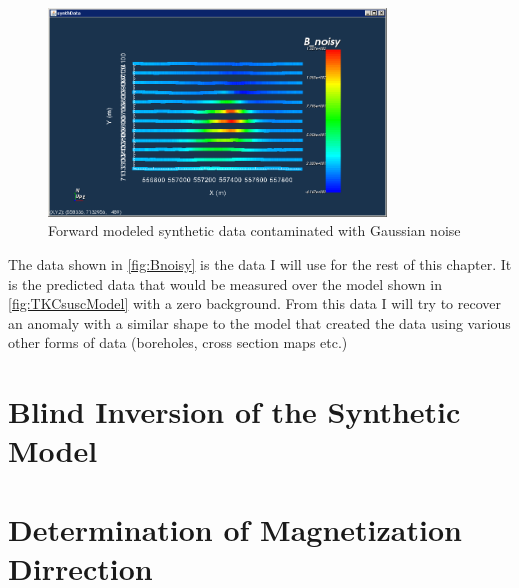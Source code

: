 \begin{figure} [h]
   \centering
   \includegraphics[width=0.8\textwidth]{images/TKC/Bnoisy.PNG}
   \caption{Forward modeled synthetic data contaminated with Gaussian noise}
   \label{fig:Bnoisy}
\end{figure}

The data shown in \autoref{fig:Bnoisy} is the data I will use for the rest of this chapter. It is the predicted data that would be measured over the model shown in \autoref{fig:TKCsuscModel} with a zero background. From this data I will try to recover an anomaly with a similar shape to the model that created the data using various other forms of data (boreholes, cross section maps etc.)


\FloatBarrier
\section{Blind Inversion of the Synthetic Model}
\label{sec:Blind Inversion of the Synthetic Model:TKC}


\section{Determination of Magnetization Dirrection}
\label{sec:Determination of Magnetization Dirrection}
%
%
%
%
%

